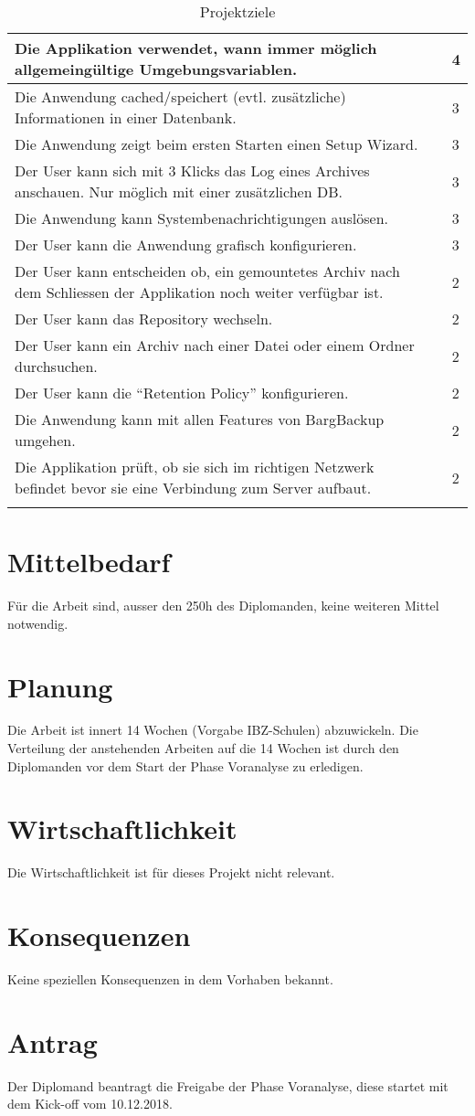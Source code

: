 \begin{longtable}{|p{9cm}|p{1.5cm}|p{2cm}|}
\hline
Die Applikation verwendet, wann immer möglich allgemeingültige Umgebungsvariablen. &  & 4\\
\hline
Die Anwendung cached/speichert (evtl. zusätzliche) Informationen in einer Datenbank. &  & 3\\
\hline
Die Anwendung zeigt beim ersten Starten einen Setup Wizard. &  & 3\\
\hline
Der User kann sich mit 3 Klicks das Log eines Archives anschauen. Nur möglich mit einer zusätzlichen DB. &  & 3\\
\hline
Die Anwendung kann Systembenachrichtigungen auslösen. &  & 3\\
\hline
Der User kann die Anwendung grafisch konfigurieren. &  & 3\\
\hline
Der User kann entscheiden ob, ein gemountetes Archiv nach dem Schliessen der Applikation noch weiter verfügbar ist. &  & 2\\
\hline
Der User kann das Repository wechseln. &  & 2\\
\hline
Der User kann ein Archiv nach einer Datei oder einem Ordner durchsuchen. &  & 2\\
\hline
Der User kann die "`Retention Policy"' konfigurieren. &  & 2\\
\hline
Die Anwendung kann mit allen Features von BargBackup umgehen. &  & 2\\
\hline
Die Applikation prüft, ob sie sich im richtigen Netzwerk befindet bevor sie eine Verbindung zum Server aufbaut. &  & 2\\
\hline
\caption{\label{tab:orgff063d3}
Projektziele}
\\
\end{longtable}

\section{Mittelbedarf}
\label{sec:org6910770}
Für die Arbeit sind, ausser den 250h des Diplomanden, keine weiteren Mittel
notwendig.

\section{Planung}
\label{sec:org9f98553}

Die Arbeit ist innert 14 Wochen (Vorgabe IBZ-Schulen) abzuwickeln. Die
Verteilung der anstehenden Arbeiten auf die 14 Wochen ist durch den Diplomanden
vor dem Start der Phase Voranalyse zu erledigen.

\section{Wirtschaftlichkeit}
\label{sec:orgdfdbedf}
Die Wirtschaftlichkeit ist für dieses Projekt nicht relevant.

\section{Konsequenzen}
\label{sec:org94d301e}
Keine speziellen Konsequenzen in dem Vorhaben bekannt.

\section{Antrag}
\label{sec:orga61ac18}
Der Diplomand beantragt die Freigabe der Phase Voranalyse, diese startet mit dem
Kick-off vom 10.12.2018.
